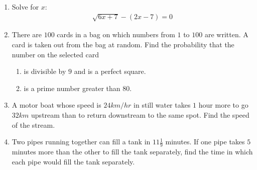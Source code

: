 \documentclass{article}                                         %
\begin{document}
                                                                                                                \begin{enumerate}
\item Solve for $x$:
    \begin{align}
        \sqrt{6x + 7} - (2x - 7) = 0
    \end{align}
\item There are $100$ cards in a bag on which numbers from $1$ to $100$ are written. A card is taken out from the bag at random. Find the probability that the number on the selected card
    \begin{enumerate}
        \item is divisible by $9$ and is a perfect square.
        \item is a prime number greater than $80$.                  \end{enumerate}
\item A motor boat whose speed is $24 km/hr$ in still water takes $1$ hour     more to go $32 km$ upstream than to return downstream to the same spot. Find the speed of the stream.
\item Two pipes running together can fill a tank in $11\frac{1}{9}$ minutes. If one pipe takes $5$ minutes more than the other to fill the tank separately, find the time in which each pipe would fill the tank separately.
								\end{enumerate}                                                 
\end{document}
